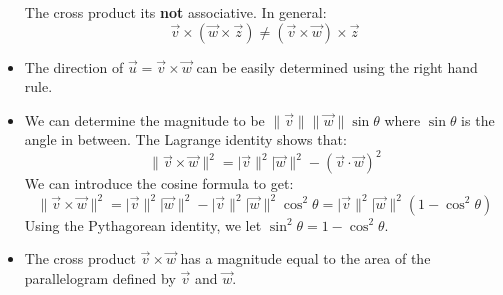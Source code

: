 \begin{itemize}
\begin{itemize}
\begin{equation}
            \label{eq:}
        \end{equation}
    \end{itemize}
    \begin{warning}
        The cross product its \textbf{not} associative. In general:
        \begin{equation}
            \vec{v}\times (\vec{w}\times \vec{z}) \neq (\vec{v} \times \vec{w}) \times \vec{z}
            \label{eq:}
        \end{equation}
    \end{warning}
    \item The direction of $\vec{u}=\vec{v}\times \vec{w}$ can be easily determined using the right hand rule.
    \item We can determine the magnitude to be $\lVert \vec{v} \rVert \lVert \vec{w} \rVert \sin\theta$ where $\sin\theta$ is the angle in between. The Lagrange identity shows that:
    \begin{equation}
        \lVert \vec{v} \times \vec{w} \rVert^2 = \lvert \vec{v} \rVert^2 \lvert \vec{w}\rVert^2 - (\vec{v}\cdot\vec{w})^2
        \label{eq:}
    \end{equation}
    We can introduce the cosine formula to get:
    \begin{equation}
        \lVert \vec{v} \times \vec{w} \rVert^2 = \lvert \vec{v} \rVert^2 \lvert \vec{w}\rVert^2 - \lvert \vec{v} \rVert^2 \lvert \vec{w}\rVert^2\cos^2\theta = \lvert \vec{v} \rVert^2 \lvert \vec{w}\rVert^2(1-\cos^2\theta)
        \label{eq:}
    \end{equation}
    Using the Pythagorean identity, we let $\sin^2\theta=1-\cos^2\theta$.
    \item The cross product $\vec{v}\times \vec{w}$ has a magnitude equal to the area of the parallelogram defined by $\vec{v}$ and $\vec{w}$.
\end{itemize}